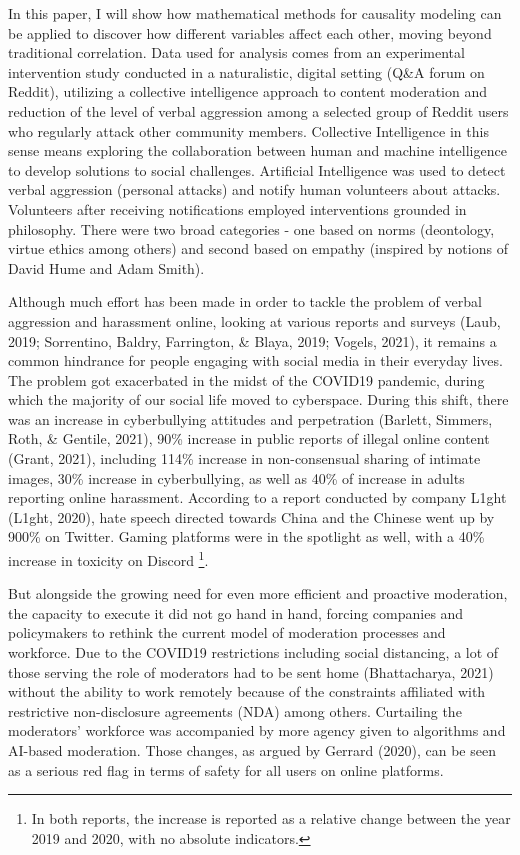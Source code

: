 \documentclass[
  10pt,
  dvipsnames,enabledeprecatedfontcommands]{scrartcl}
\begin{document}
In this paper, I will show how mathematical methods for causality
modeling can be applied to discover how different variables affect each
other, moving beyond traditional correlation. Data used for analysis
comes from an experimental intervention study conducted in a
naturalistic, digital setting (Q\&A forum on Reddit), utilizing a
collective intelligence approach to content moderation and reduction of
the level of verbal aggression among a selected group of Reddit users
who regularly attack other community members. Collective Intelligence in
this sense means exploring the collaboration between human and machine
intelligence to develop solutions to social challenges. Artificial
Intelligence was used to detect verbal aggression (personal attacks) and
notify human volunteers about attacks. Volunteers after receiving
notifications employed interventions grounded in philosophy. There were
two broad categories - one based on norms (deontology, virtue ethics
among others) and second based on empathy (inspired by notions of David
Hume and Adam Smith).

Although much effort has been made in order to tackle the problem of
verbal aggression and harassment online, looking at various reports and
surveys (Laub, 2019; Sorrentino, Baldry, Farrington, \& Blaya, 2019;
Vogels, 2021), it remains a common hindrance for people engaging with
social media in their everyday lives. The problem got exacerbated in the
midst of the COVID19 pandemic, during which the majority of our social
life moved to cyberspace. During this shift, there was an increase in
cyberbullying attitudes and perpetration (Barlett, Simmers, Roth, \&
Gentile, 2021), 90\% increase in public reports of illegal online
content (Grant, 2021), including 114\% increase in non-consensual
sharing of intimate images, 30\% increase in cyberbullying, as well as
40\% of increase in adults reporting online harassment. According to a
report conducted by company L1ght (L1ght, 2020), hate speech directed
towards China and the Chinese went up by 900\% on Twitter. Gaming
platforms were in the spotlight as well, with a 40\% increase in
toxicity on Discord
\footnote{In both reports, the increase is reported as a relative change between the year 2019 and 2020, with no absolute indicators.}.

But alongside the growing need for even more efficient and proactive
moderation, the capacity to execute it did not go hand in hand, forcing
companies and policymakers to rethink the current model of moderation
processes and workforce. Due to the COVID19 restrictions including
social distancing, a lot of those serving the role of moderators had to
be sent home (Bhattacharya, 2021) without the ability to work remotely
because of the constraints affiliated with restrictive non-disclosure
agreements (NDA) among others. Curtailing the moderators' workforce was
accompanied by more agency given to algorithms and AI-based moderation.
Those changes, as argued by Gerrard (2020), can be seen as a serious red
flag in terms of safety for all users on online platforms.
\end{document}
